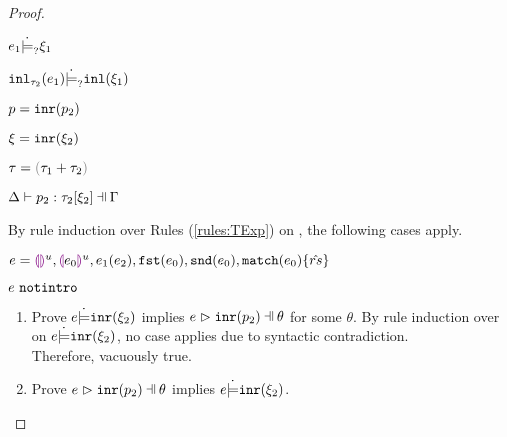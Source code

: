 \begin{proof}
\begin{byCases}
\begin{byCases}
\begin{enumerate}
\begin{byCases}
\begin{pfsteps*}
                \item $e_1 \dot{\models}_{?} \xi_1$  
                \item $\mathtt{inl}_{\tau_2}({e_1}) \dot{\models}_{?} \mathtt{inl}(\xi_1)$ 
                \end{pfsteps*}
            \end{byCases}
        \end{enumerate}
    \end{byCases}
\item[\text{(\ref{rule:PTInr})}]
    \begin{pfsteps*}
    \item $p=\mathtt{inr}(p_2)$ 
    \item $\xi=\mathtt{inr}(\xi_2)$ 
    \item $\tau=\tsum{\tau_1}{\tau_2}$ 
    \item $\chpattyp{p_2}{\tau_2}{\xi_2}{\Gamma}{\Delta}$  
    \end{pfsteps*}
    By rule induction over Rules (\ref{rules:TExp}) on , the following cases apply.
    \begin{byCases}
    \item[\text{(\ref{rule:TEHole}),(\ref{rule:THole}),(\ref{rule:TAp}),(\ref{rule:TFst}),(\ref{rule:TSnd}),(\ref{rule:TMatchZPre}),(\ref{rule:TMatchNZPre})}]
        \begin{pfsteps*}
        \item $e=\textcolor{violet}{\llparenthesis}\textcolor{violet}{\rrparenthesis}^{u},\textcolor{violet}{\llparenthesis} e_0\textcolor{violet}{\rrparenthesis}^{u},e_1(e_2),\mathtt{fst}(e_0),\mathtt{snd}(e_0),\mathtt{match}(e_0) \{\hat{rs}\}$ 
        \item $e ~\mathtt{notintro}$  
        \end{pfsteps*}
        \begin{enumerate}
        \item Prove $e \dot{\models} \mathtt{inr}(\xi_2)$ implies $\hpatmatch{e}{\hinrp{p_2}}{\theta}$ for some $\theta$.
        By rule induction over  on $e \dot{\models} \mathtt{inr}(\xi_2)$, no case applies due to syntactic contradiction. \\ Therefore, vacuously true.
        \item Prove $\hpatmatch{e}{\hinrp{p_2}}{\theta}$ implies $e \dot{\models} \mathtt{inr}(\xi_2)$.

\end{enumerate}
\end{byCases}
\end{byCases}
\end{proof}
